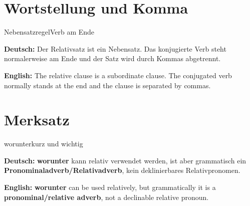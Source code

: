 \documentclass[a4paper,11pt]{article}
\newcommand{\GermanText}[1]{\textbf{Deutsch: }#1\par}
\newcommand{\EnglishText}[1]{{\small\color{SoftGray}\textbf{English: }#1\par}}
\begin{document}
\section{Wortstellung und Komma}

\begin{grammarentry}{Nebensatzregel}{Verb am Ende}

\GermanText{Der Relativsatz ist ein Nebensatz. Das konjugierte Verb steht normalerweise am Ende und der Satz wird durch Kommas abgetrennt.}

\EnglishText{The relative clause is a subordinate clause. The conjugated verb normally stands at the end and the clause is separated by commas.}

\end{grammarentry}

\section{Merksatz}

\begin{grammarentry}{worunter}{kurz und wichtig}

\GermanText{\textbf{worunter} kann relativ verwendet werden, ist aber grammatisch ein \textbf{Pronominaladverb/Relativadverb}, kein deklinierbares Relativpronomen.}

\EnglishText{\textbf{worunter} can be used relatively, but grammatically it is a \textbf{pronominal/relative adverb}, not a declinable relative pronoun.}

\end{grammarentry}
\end{document}
